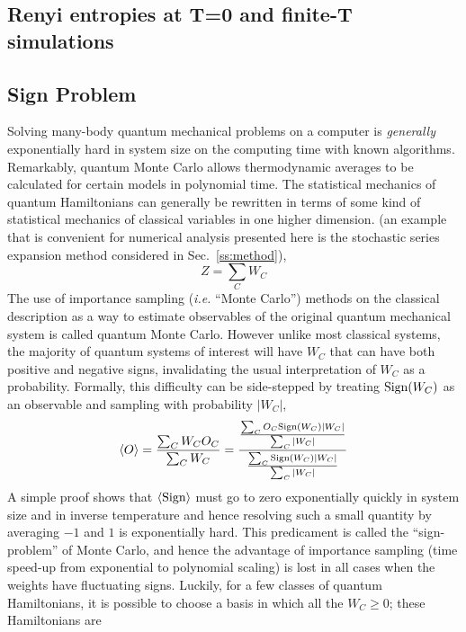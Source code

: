 \documentclass[aps,prb,groupedaddress,twocolumn]{revtex4}
\begin{document}
\subsection{Renyi entropies at T=0 and finite-T simulations}

\subsection{Sign Problem}
\label{ss:sign}

Solving many-body quantum mechanical problems on a computer is {\em generally}
exponentially hard in system size on the computing time with known
algorithms. Remarkably, quantum Monte Carlo allows thermodynamic
averages to be calculated for certain models
in polynomial time. The statistical mechanics of quantum Hamiltonians can generally be
rewritten in terms of some kind of statistical mechanics of classical
variables in one higher dimension. (an example that is
convenient for numerical analysis presented here is the stochastic series
expansion method considered in Sec.~\ref{ss:method}),
\begin{equation}
\label{eq:wc}
Z=\sum_C W_C
\end{equation}
 The use of importance sampling ({\em i.e.} ``Monte Carlo'')
methods on the classical description as a way to estimate observables of the
original quantum mechanical system is called
quantum Monte Carlo. However unlike most classical systems, the
majority of
quantum systems of interest will have $W_C$ that can have both
positive and negative signs, invalidating the usual interpretation of
$W_C$ as a probability. Formally, this difficulty can be side-stepped
by treating ${\rm  Sign} (W_C)$ as an observable and sampling with
probability $|W_C|$,
\begin{equation}
\langle O \rangle = \frac{\sum_C W_C O_C}{\sum_C W_C} =
\frac{\frac{\sum_C O_C {\rm Sign}(W_C) |W_C|}{\sum_{C}|W_C|}}{\frac{\sum_C
    {\rm Sign}(W_C)|W_C|}{\sum_{C}|W_C|}}
\end{equation}
A simple proof shows that $\langle {\rm Sign}\rangle$ must go to zero
exponentially quickly in system size and in inverse temperature and hence
resolving such a small quantity by averaging $-1$ and $1$ is
exponentially hard. This predicament is called the ``sign-problem'' of
Monte Carlo, and hence the advantage of importance sampling (time speed-up
from exponential to polynomial scaling) is
lost in all cases when the weights have fluctuating signs. Luckily, for a few classes of quantum Hamiltonians, it is possible to
choose a basis in which all the $W_C\geq 0$; these Hamiltonians are
\end{document}
